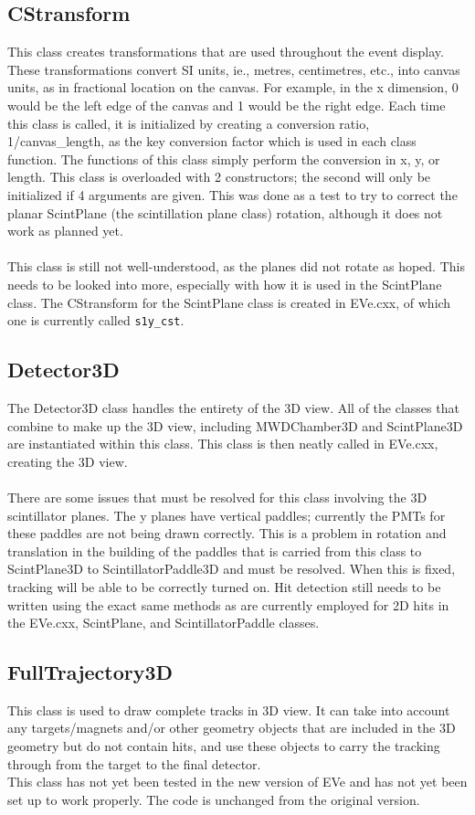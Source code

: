 \documentclass[12pt]{article}
\numberwithin{equation}{section}
\begin{document}
\subsection{CStransform}
This class creates transformations that are used throughout the event display. These transformations convert SI units, ie., metres, centimetres, etc., into canvas units, as in fractional location on the canvas. For example, in the x dimension, 0 would be the left edge of the canvas and 1 would be the right edge. Each time this class is called, it is initialized by creating a conversion ratio, 1/canvas\_length, as the key conversion factor which is used in each class function. The functions of this class simply perform the conversion in x, y, or length. This class is overloaded with 2 constructors; the second will only be initialized if 4 arguments are given. This was done as a test to try to correct the planar ScintPlane (the scintillation plane class) rotation, although it does not work as planned yet. 
\\
\\
This class is still not well-understood, as the planes did not rotate as hoped. This needs to be looked into more, especially with how it is used in the ScintPlane class. The CStransform for the ScintPlane class is created in EVe.cxx, of which one is currently called \texttt{s1y\_cst}.

\subsection{Detector3D}
The Detector3D class handles the entirety of the 3D view. All of the classes that combine to make up the 3D view, including MWDChamber3D and ScintPlane3D are instantiated within this class. This class is then neatly called in EVe.cxx, creating the 3D view.
\\
\\
There are some issues that must be resolved for this class involving the 3D scintillator planes. The y planes have vertical paddles; currently the PMTs for these paddles are not being drawn correctly. This is a problem in rotation and translation in the building of the paddles that is carried from this class to ScintPlane3D to ScintillatorPaddle3D and must be resolved. When this is fixed, tracking will be able to be correctly turned on. Hit detection still needs to be written using the exact same methods as are currently employed for 2D hits in the EVe.cxx, ScintPlane, and ScintillatorPaddle classes.

\subsection{FullTrajectory3D}
This class is used to draw complete tracks in 3D view. It can take into account any targets/magnets and/or other geometry objects that are included in the 3D geometry but do not contain hits, and use these objects to carry the tracking through from the target to the final detector.
\\
This class has not yet been tested in the new version of EVe and has not yet been set up to work properly. The code is unchanged from the original version.
\end{document}
